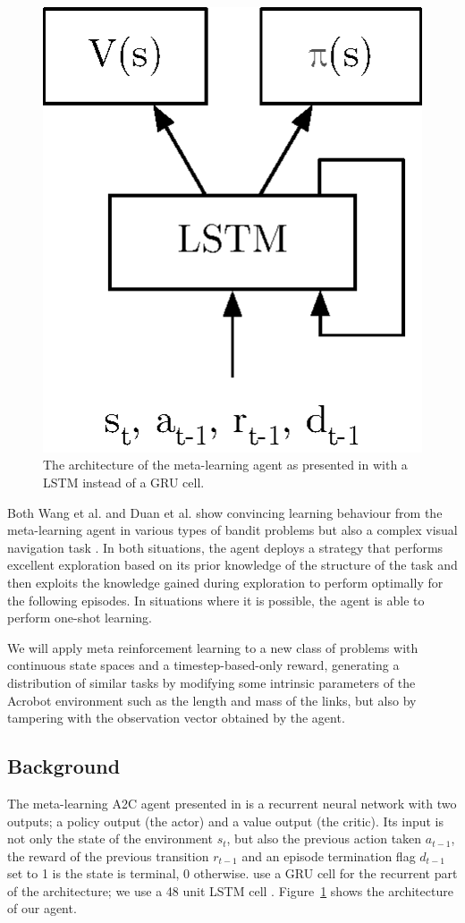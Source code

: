 \documentclass[letterpaper]{article}
\begin{document}
\begin{figure}[h]
	\centering
	\includegraphics[width=.4\linewidth]{fig/a2c_meta.eps}
	\caption{The architecture of the meta-learning agent as presented in
	\cite{learningtorl} with a LSTM instead of a GRU cell.}
	\label{fig:a2c}
\end{figure}

Both Wang et al. and Duan et al. show convincing learning behaviour from
the meta-learning agent in various types of bandit problems but also
a complex visual navigation task \citep{learningtonavigate}. In both situations, 
the agent deploys a strategy that performs excellent exploration based on its 
prior knowledge of the structure of the task 
and then exploits the knowledge gained during exploration to perform 
optimally for the following episodes. In situations where it is possible, the
agent is able to perform one-shot learning.

We will apply meta reinforcement learning to a new class of problems with
continuous state spaces and a timestep-based-only reward, generating 
a distribution of similar tasks by modifying some intrinsic parameters
of the Acrobot environment such as the length and mass of the links, but also
by tampering with the observation vector obtained by the agent.

\subsection{Background} 
The meta-learning A2C agent presented in \cite{learningtorl} is a recurrent
neural network with two outputs; a policy output (the actor) and a value
output (the critic). Its input is not only the state of the environment $s_t$,
but also the previous action taken $a_{t-1}$, the reward of the previous
transition $r_{t-1}$ and an episode termination flag $d_{t-1}$ set to 1 is the
state is terminal, 0 otherwise. \cite{learningtorl} use a GRU \citep{grus} cell
for the recurrent part of the architecture; we use a 48 unit LSTM cell 
\citep{lstm}. Figure~\ref{fig:a2c} shows the architecture of our agent.
\end{document}
